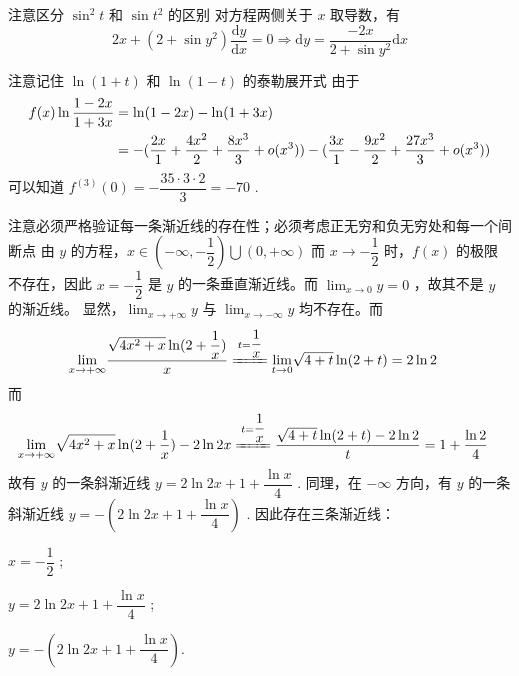 \begin{answer}[660T38]{注意区分 $ \sin^2 t $ 和 $ \sin t^2 $ 的区别}
    对方程两侧关于 $ x $ 取导数，有$$
        2x + (2+\sin y^2) \dfrac{\mathrm{d}y}{\mathrm{d}x} = 0 \Rightarrow
        \mathrm{d}y = \dfrac{-2x}{2+\sin y^2}\mathrm{d}x
    $$ 
\end{answer}

\begin{answer}[660T40]{注意记住 $ \ln (1+t) $ 和 $ \ln (1-t) $ 的泰勒展开式}
    由于\begin{equation*}
        \begin{aligned}
            \displaystyle f(x) \ln \dfrac{1-2x}{1+3x} &= \ln (1-2x) - \ln (1+3x) \\&=
            -(\dfrac{2x}{1}+\dfrac{4x^2}{2}+\dfrac{8x^3}{3}+o(x^3))-
            (\dfrac{3x}{1}-\dfrac{9x^2}{2}+\dfrac{27x^3}{3}+o(x^3))
        \end{aligned}
    \end{equation*}
    可以知道 $ f^{(3)}(0) = -\dfrac{35\cdot 3\cdot 2}{3} = -70 $ .
\end{answer}

\begin{answer}[660T48]{注意必须严格验证每一条渐近线的存在性；必须考虑正无穷和负无穷处和每一个间断点}
    由 $ y $ 的方程，$ x \in (-\infty,-\dfrac{1}{2})\bigcup (0,+\infty) $
    而 $ x \rightarrow -\dfrac{1}{2} $ 时，$ f(x) $ 的极限不存在，因此 $ x = -\dfrac{1}{2} $ 是
    $ y $ 的一条垂直渐近线。而 $ {\displaystyle\lim_{x\rightarrow 0}}y = 0 $ ，故其不是 $ y $ 的渐近线。
    显然，$ {\displaystyle\lim_{x\rightarrow +\infty}}y $ 与 $ {\displaystyle\lim_{x\rightarrow -\infty}}y $ 
    均不存在。而
    \begin{equation*}
        \begin{aligned}
            {\displaystyle\lim_{x\rightarrow +\infty}}\dfrac{\sqrt{4x^2+x}\ln (2+\dfrac{1}{x})}{x}
            &\xlongequal{t = \dfrac{1}{x}}
            {\displaystyle\lim_{t\rightarrow 0}}\sqrt{4+t}\ln(2+t) = 2\ln 2
        \end{aligned}
    \end{equation*}
    而
    \begin{equation*}
        \begin{aligned}
            {\displaystyle\lim_{x\rightarrow +\infty}}\sqrt{4x^2+x}\ln (2+\dfrac{1}{x})-2\ln 2x
            &\xlongequal{t = \dfrac{1}{x}} \dfrac{\sqrt{4+t}\ln (2+t)-2\ln 2}{t} = 1+ \dfrac{\ln 2}{4}
        \end{aligned}
    \end{equation*}
    故有 $ y $ 的一条斜渐近线 $ y = 2\ln 2 x + 1 + \dfrac{\ln x}{4} $ .
    同理，在 $ -\infty $ 方向，有 $ y $ 的一条斜渐近线 $ y = -(2\ln 2 x + 1 + \dfrac{\ln x}{4}) $ .
    因此存在三条渐近线：
    \begin{BulletItemize}
        \item[\textbullet] $ x = -\dfrac{1}{2} $ ;
        \item[\textbullet] $ y = 2\ln 2 x + 1 + \dfrac{\ln x}{4} $ ;
        \item[\textbullet] $ y = -(2\ln 2 x + 1 + \dfrac{\ln x}{4}) $.
    \end{BulletItemize}
\end{answer}

